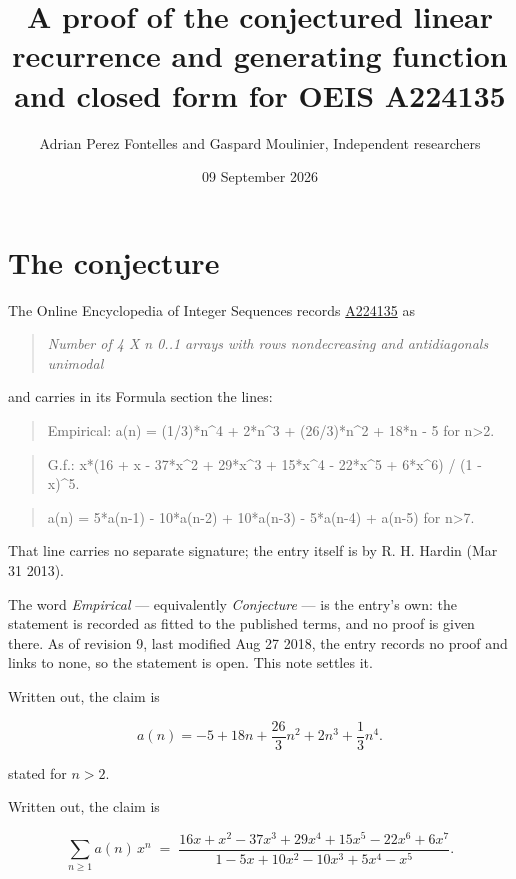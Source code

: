 \documentclass[11pt]{article}
\title{A proof of the conjectured linear recurrence and generating function and closed form for OEIS A224135}
\author{Adrian Perez Fontelles and Gaspard Moulinier, Independent researchers}
\date{09 September 2026}
\theoremstyle{definition}
\begin{document}
\maketitle
\section{The conjecture}

The Online Encyclopedia of Integer Sequences records \href{https://oeis.org/A224135}{A224135} as

\begin{quote}\itshape Number of 4 X n 0..1 arrays with rows nondecreasing and antidiagonals unimodal\end{quote}

and carries in its Formula section the lines:

\begin{quote}\ttfamily Empirical: a(n) = (1/3)*n\textasciicircum{}4 + 2*n\textasciicircum{}3 + (26/3)*n\textasciicircum{}2 + 18*n - 5 for n>2.\end{quote}

\begin{quote}\ttfamily G.f.: x*(16 + x - 37*x\textasciicircum{}2 + 29*x\textasciicircum{}3 + 15*x\textasciicircum{}4 - 22*x\textasciicircum{}5 + 6*x\textasciicircum{}6) / (1 - x)\textasciicircum{}5.\end{quote}

\begin{quote}\ttfamily a(n) = 5*a(n-1) - 10*a(n-2) + 10*a(n-3) - 5*a(n-4) + a(n-5) for n>7.\end{quote}

That line carries no separate signature; the entry itself is by R. H. Hardin (Mar 31 2013).

The word {\itshape Empirical} --- equivalently {\itshape Conjecture} --- is the entry's own: the statement is recorded as fitted to the published terms, and no proof is given there. As of revision 9, last modified Aug 27 2018, the entry records no proof and links to none, so the statement is open. This note settles it.

Written out, the claim is

\[a(n) = -5 + 18n + \frac{26}{3}n^{2} + 2n^{3} + \frac{1}{3}n^{4}.\]

stated for $n > 2$.

Written out, the claim is

\[\sum_{n \ge 1} a(n)\,x^n \;=\; \frac{16x + x^{2} - 37x^{3} + 29x^{4} + 15x^{5} - 22x^{6} + 6x^{7}}{1 - 5x + 10x^{2} - 10x^{3} + 5x^{4} - x^{5}}.\]
\end{document}
